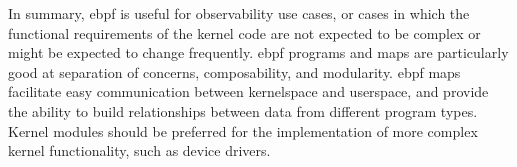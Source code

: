 In summary, \gls{ebpf} is useful for observability use cases, or cases in which the functional
requirements of the kernel code are not expected to be complex or might be expected to
change frequently. \gls{ebpf} programs and maps are particularly good at separation of concerns,
composability, and modularity. \gls{ebpf} maps facilitate easy communication between kernelspace
and userspace, and provide the ability to build relationships between data from different
program types. Kernel modules should be preferred for the implementation of more complex
kernel functionality, such as device drivers.
